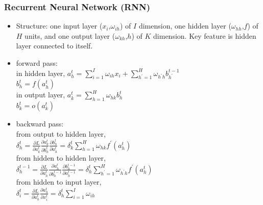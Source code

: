 \begin{frame}
\frametitle{Recurrent Neural Network (RNN)}
	\scriptsize
	\begin{itemize}
		\item Structure: one input layer ($x_i$,$\omega_{ih}$) of $I$ dimension, one hidden layer ($\omega_{hh}$,$f$) of $H$ units, and one output layer ($\omega_{kh}$,$h$) of $K$ dimension. Key feature is hidden layer connected to itself.
		\item forward pass:
		\\\hspace{0.5cm}in hidden layer, $a_h^t=\sum_{i=1}^{I}\omega_{ih}x_i+
									\sum_{h^{\prime}=1}^{H}
										\omega_{h^{\prime}h}b_{h^{\prime}}^{t-1}$
		\\\hspace{3cm} $b_h^t=f(a_h^t)$
		\\\hspace{0.5cm}in output layer, $a_k^t=\sum_{h=1}^{H}\omega_{hk}b_h^t$
		\\\hspace{3cm} $b_k^t=o(a_k^t)$
		\item backward pass:
		\\\hspace{0.5cm}from output to hidden layer, 
			\\\hspace{1cm} $\delta_h^t
							=
							 \frac{\partial{L}}{\partial{a_k^t}}
							 \frac{\partial{a_k^t}}{\partial{b_h^t}}
							 \frac{\partial{b_h^t}}{\partial{a_h^t}}
							=
							 \delta_k^t
							 \sum_{h=1}^{H}
							 \omega_{hk}
							 f^\prime(a_h^t)$
		\\\hspace{0.5cm}from hidden to hidden layer, 
			\\\hspace{1cm}$\delta_h^{t-1}
								=\frac{\partial{L}}{\partial{a_h^t}}
								 \frac{\partial{a_h^t}}{\partial{b_h^{t-1}}}
								 \frac{\partial{b_h^{t-1}}}{\partial{a_h^{t-1}}}
								=\delta_h^t
								 \sum_{h^{\prime}=1}^{H}\omega_{h^{\prime}h}
								 f^{\prime}(a_h^t)$
		\\\hspace{0.5cm}from hidden to input layer, 
			\\\hspace{1cm}$\delta_i^{t}
								=\frac{\partial{L}}{\partial{a_h^t}}
								 \frac{\partial{a_h^{t}}}{\partial{x_i^{t}}}
								=\delta_h^t
								 \sum_{i=1}^{I}\omega_{ih}$
	\end{itemize}
\end{frame}
